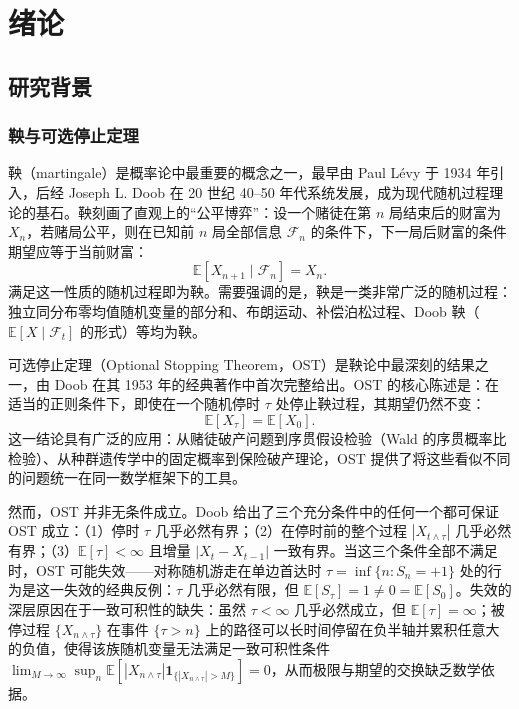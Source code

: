 \section{绪论}

\subsection{研究背景}

\subsubsection{鞅与可选停止定理}

鞅（martingale）是概率论中最重要的概念之一，最早由 Paul L\'{e}vy 于 1934 年引入，后经 Joseph L. Doob 在 20 世纪 40--50 年代系统发展，成为现代随机过程理论的基石。鞅刻画了直观上的``公平博弈''：设一个赌徒在第 $n$ 局结束后的财富为 $X_n$，若赌局公平，则在已知前 $n$ 局全部信息 $\mathcal{F}_n$ 的条件下，下一局后财富的条件期望应等于当前财富：
\begin{equation}
  \mathbb{E}[X_{n+1} \mid \mathcal{F}_n] = X_n.
\end{equation}
满足这一性质的随机过程即为鞅。需要强调的是，鞅是一类非常广泛的随机过程：独立同分布零均值随机变量的部分和、布朗运动、补偿泊松过程、Doob 鞅（$\mathbb{E}[X \mid \mathcal{F}_t]$ 的形式）等均为鞅。

可选停止定理（Optional Stopping Theorem，OST）是鞅论中最深刻的结果之一，由 Doob 在其 1953 年的经典著作中首次完整给出\cite{doob1953stochastic}。OST 的核心陈述是：在适当的正则条件下，即使在一个随机停时 $\tau$ 处停止鞅过程，其期望仍然不变：
\begin{equation}
  \mathbb{E}[X_\tau] = \mathbb{E}[X_0].
\end{equation}
这一结论具有广泛的应用：从赌徒破产问题\cite{qian2021randomprocess}到序贯假设检验（Wald 的序贯概率比检验）、从种群遗传学中的固定概率\cite{moran1958random}到保险破产理论\cite{asmussen2010ruin}，OST 提供了将这些看似不同的问题统一在同一数学框架下的工具。

然而，OST 并非无条件成立。Doob 给出了三个充分条件中的任何一个都可保证 OST 成立：（1）停时 $\tau$ 几乎必然有界；（2）在停时前的整个过程 $|X_{t \wedge \tau}|$ 几乎必然有界；（3）$\mathbb{E}[\tau] < \infty$ 且增量 $|X_t - X_{t-1}|$ 一致有界。当这三个条件全部不满足时，OST 可能失效——对称随机游走在单边首达时 $\tau = \inf\{n: S_n = +1\}$ 处的行为是这一失效的经典反例：$\tau$ 几乎必然有限，但 $\mathbb{E}[S_\tau] = 1 \neq 0 = \mathbb{E}[S_0]$。失效的深层原因在于一致可积性的缺失：虽然 $\tau < \infty$ 几乎必然成立，但 $\mathbb{E}[\tau] = \infty$；被停过程 $\{X_{n \wedge \tau}\}$ 在事件 $\{\tau > n\}$ 上的路径可以长时间停留在负半轴并累积任意大的负值，使得该族随机变量无法满足一致可积性条件 $\lim_{M \to \infty} \sup_n \mathbb{E}[|X_{n \wedge \tau}| \mathbf{1}_{\{|X_{n \wedge \tau}| > M\}}] = 0$，从而极限与期望的交换缺乏数学依据。


